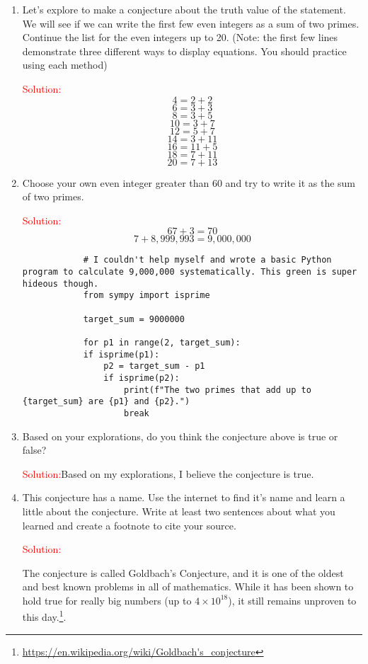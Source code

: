 \documentclass[12pt]{article}
\theoremstyle{definition}
\newcommand{\solution}{\textcolor{Red}{Solution:\newline}}
\begin{document}
\begin{enumerate}
\begin{enumerate}[label=(\alph*)]
            \item Let's explore to make a conjecture about the truth value of the statement. We will see if we can write the first few even integers as a sum of two primes. Continue the list for the even integers up to 20. (Note: the first few lines demonstrate three different ways to display equations. You should practice using each method)

            \solution
            $$4 = 2 + 2$$
            $$6 = 3 + 3$$
            $$8 = 3 + 5$$
            $$10 = 3 + 7$$
            $$12 = 5 + 7$$
            $$14 = 3 + 11$$
            $$16 = 11 + 5$$
            $$18 = 7 + 11$$
            $$20 = 7 + 13$$
                        
            \item Choose your own even integer greater than 60 and try to write it as the sum of two primes.
            
            \solution
            $$67 + 3 = 70$$
            $$7 + 8,999,993 = 9,000,000$$

            \begin{lstlisting}
            # I couldn't help myself and wrote a basic Python program to calculate 9,000,000 systematically. This green is super hideous though.
            from sympy import isprime

            target_sum = 9000000

            for p1 in range(2, target_sum):
            if isprime(p1):
                p2 = target_sum - p1
                if isprime(p2):
                    print(f"The two primes that add up to {target_sum} are {p1} and {p2}.")
                    break

            \end{lstlisting}
            
            \item Based on your explorations, do you think the conjecture above is true or false?
            
            \solution Based on my explorations, I believe the conjecture is true.
            
            \item This conjecture has a name. Use the internet to find it's name and learn a little about the conjecture. Write at least two sentences about what you learned and create a footnote to cite your source.
            
            \solution

            The conjecture is called Goldbach's Conjecture, and it is one of the oldest and best known problems in all of mathematics. While it has been shown to hold true for really big numbers (up to $4 \times 10^{18}$), it still remains unproven to this day.\footnote{\url{https://en.wikipedia.org/wiki/Goldbach's_conjecture}}.
            
        \end{enumerate}
        
\end{enumerate}

 
\end{document}
